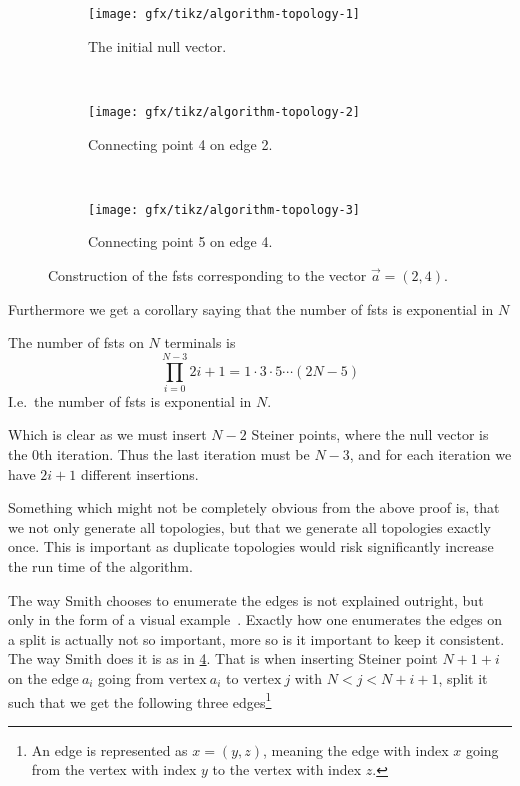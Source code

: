 \begin{figure}[htbp] \centering
  \begin{subfigure}[t]{0.267\textwidth}
    \texttt{[image: gfx/tikz/algorithm-topology-1]}
    \caption{The initial null vector.\label{fig:algorithm-topology-1}}
  \end{subfigure} ~
  \begin{subfigure}[t]{0.267\textwidth}
    \texttt{[image: gfx/tikz/algorithm-topology-2]}
    \caption{Connecting point 4 on edge 2.\label{fig:algorithm-topology-2}}
  \end{subfigure} ~
  \begin{subfigure}[t]{0.267\textwidth}
    \texttt{[image: gfx/tikz/algorithm-topology-3]}
    \caption{Connecting point 5 on edge 4.\label{fig:algorithm-topology-3}}
  \end{subfigure}
  \caption[Construction of FSTs]{Construction of the \glspl{fst} corresponding
to the vector $\vec{a} = (2, 4)$.\label{fig:algorithm-topologies}}
\end{figure}

Furthermore we get a corollary saying that the number of \glspl{fst} is
exponential in $N$

\begin{corollary}
\label{cor:number-of-fsts} The number of \glspl{fst} on $N$ terminals is
\[\prod_{i=0}^{N-3} 2i+1 = 1 \cdot 3 \cdot 5 \cdots (2N - 5)\] I.e.\ the number
of \glspl{fst} is exponential in $N$.
\end{corollary}

Which is clear as we must insert $N-2$ Steiner points, where the null vector is
the $0$th iteration.  Thus the last iteration must be $N-3$, and for each
iteration we have $2i+1$ different insertions.

Something which might not be completely obvious from the above proof is, that we
not only generate all topologies, but that we generate all topologies exactly
once.  This is important as duplicate topologies would risk significantly
increase the run time of the algorithm.


The way Smith chooses to enumerate the edges is not explained outright, but only
in the form of a visual example~\cite[p.~143]{Smith1992}.  Exactly how one
enumerates the edges on a split is actually not so important, more so is it
important to keep it consistent.  The way Smith does it is as in
\cref{fig:algorithm-topologies}.  That is when inserting Steiner point $N+1+i$
on the $\text{edge}~a_{i}$ going from $\text{vertex}~a_i$ to $\text{vertex}~j$
with $N < j < N+i+1$, split it such that we get the following three
edges\footnote{An edge is represented as $x = (y, z)$, meaning the edge with
  index $x$ going from the vertex with index $y$ to the vertex with index
  $z$.}

